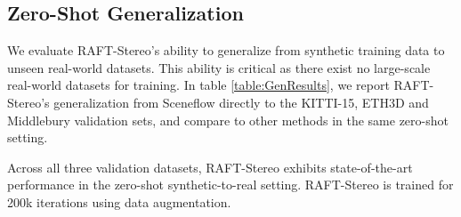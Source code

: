 \documentclass[10pt,twocolumn,letterpaper]{article}
\begin{document}
\subsection{Zero-Shot Generalization}
\setlength\tabcolsep{.4em}
\begin{table}[t]
\centering
{}
\vspace{1mm}
\caption{Synthetic to real generalization experiments. All methods were trained on SceneFlow\cite{sceneflow} and tested on the KITTI-2015, Middlebury, and ETH3D validation datasets. We report average results across six independent training runs evaluated after 200k steps. Errors are the percent of pixels with end-point-error greater than the specified threshold. We use the standard evaluation thresholds: 3px for KITTI, 2px for Middlebury, 1px for ETH3D.}\vspace{-4mm}
\label{table:GenResults}
\end{table}

We evaluate RAFT-Stereo's ability to generalize from synthetic training data to unseen real-world datasets. This ability is critical as there exist no large-scale real-world datasets for training. In table \ref{table:GenResults}, we report RAFT-Stereo's generalization from Sceneflow \cite{sceneflow} directly to the KITTI-15, ETH3D and Middlebury validation sets, and compare to other methods in the same zero-shot setting.

Across all three validation datasets, RAFT-Stereo exhibits state-of-the-art performance in the zero-shot synthetic-to-real setting. RAFT-Stereo is trained for 200k iterations using data augmentation. 
\end{document}
